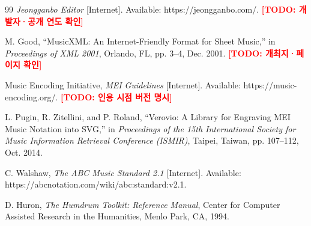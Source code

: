 \documentclass[twocolumn,10pt]{article}
\newcommand{\TODO}[1]{\textcolor{red}{\textbf{[TODO: #1]}}}
\begin{document}
\begin{thebibliography}{99}
\textit{Jeongganbo Editor} [Internet]. Available: https://jeongganbo.com/.
\TODO{개발자·공개 연도 확인}

M. Good, ``MusicXML: An Internet-Friendly Format for Sheet Music,'' in
\textit{Proceedings of XML 2001}, Orlando, FL, pp. 3--4, Dec. 2001.
\TODO{개최지·페이지 확인}

Music Encoding Initiative, \textit{MEI Guidelines} [Internet].
Available: https://music-encoding.org/. \TODO{인용 시점 버전 명시}

L. Pugin, R. Zitellini, and P. Roland, ``Verovio: A Library for Engraving
MEI Music Notation into SVG,'' in \textit{Proceedings of the 15th
International Society for Music Information Retrieval Conference (ISMIR)},
Taipei, Taiwan, pp. 107--112, Oct. 2014.

C. Walshaw, \textit{The ABC Music Standard 2.1} [Internet].
Available: https://abcnotation.com/wiki/abc:standard:v2.1.

D. Huron, \textit{The Humdrum Toolkit: Reference Manual}, Center for
Computer Assisted Research in the Humanities, Menlo Park, CA, 1994.

\end{thebibliography}

\end{document}
